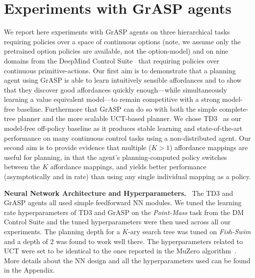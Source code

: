 \documentclass[nohyperref]{article}
\theoremstyle{plain}
\theoremstyle{definition}
\theoremstyle{remark}
\newcommand{\grasp}{{G}r{ASP} }
\renewcommand{\paragraph}[1]{\textbf{#1}\ }
\newcommand{\cutsectionup}{\vspace*{-0.05in}}
\newcommand{\cutsectiondown}{\vspace*{-0.03in}}
\begin{document}
\section{Experiments with \grasp agents}
We report here experiments with \grasp agents on three hierarchical tasks requiring policies over a space of continuous options (note, we assume only the pretrained option policies are available, not the option-model) and on nine domains from the DeepMind Control Suite~\citep{tassa2018deepmind} that requiring policies over continuous primitive-actions. %
Our first aim is to demonstrate that a planning agent using \grasp is able to learn intuitively sensible affordances and to show that they discover good affordances quickly enough---while simultaneously learning a value equivalent model---to remain competitive with a strong model-free baseline. Furthermore that \grasp can do so with both the simple complete-tree planner and the more scalable UCT-based planner. We chose TD3~\citep{dankwa2019twin} as our model-free off-policy baseline as it produces stable learning and state-of-the-art performance on many continuous control tasks using a non-distributed agent. Our second aim is to provide evidence that multiple ($K$$>$$1$) {affordance mappings} are useful for planning, in that the agent's planning-computed policy switches between the $K$ affordance mappings, and yields better performance (asymptotically and in rate) than using any single individual mapping as a policy.

\paragraph{Neural Network Architecture and Hyperparameters.} The TD3 and \grasp agents all used simple feedforward NN modules. We tuned the learning rate hyperparameters of TD3 and \grasp on the \emph{Point-Mass} task from the DM Control Suite and the tuned hyperparameters were then used across all our experiments. The planning depth for a $K$-ary search tree was tuned on \emph{Fish-Swim} and a depth of $2$ was found to work well there. The hyperparameters related to UCT were set to be identical to the ones reported in the MuZero algorithm~\citep{schrittwieser2020mastering}. More details about the NN design and all the hyperparameters used can be found in the Appendix.

\end{document}
